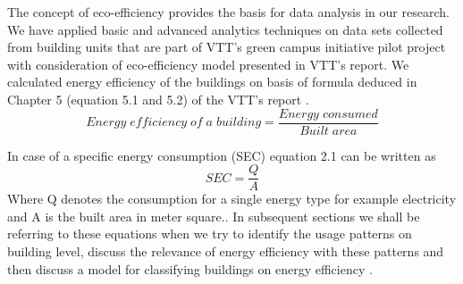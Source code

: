 The concept of eco-efficiency provides the basis for data analysis in our research.  We have applied basic and advanced analytics techniques on data sets collected from building units that are part of VTT's green campus initiative pilot project with consideration of eco-efficiency model presented in VTT's report. We calculated energy efficiency of  the buildings on basis of formula deduced in Chapter 5 (equation 5.1 and 5.2) of the VTT's  report \cite{forsstrommeasuring}.
\begin{equation}
Energy\;efficiency\;of\;a\;building  =  \frac{Energy\;consumed}{Built\;area}
\end{equation}  

In case of a specific energy consumption (SEC) \cite{forsstrommeasuring} equation 2.1 can be written as 
\begin{equation}
SEC  = \frac{Q}{A}
\end{equation} 
Where Q denotes the consumption for a single energy type for example electricity and A is the built area in meter square..  In subsequent sections we shall be  referring to these equations when we try to identify the usage patterns on building level, discuss the relevance of  energy efficiency with these patterns and then discuss a model for classifying buildings on energy efficiency .

